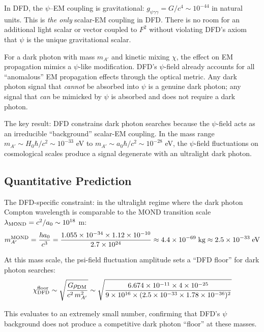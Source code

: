 \documentclass[11pt]{article}
\begin{document}
In DFD, the $\psi$--EM coupling is gravitational:
$g_{\psi\gamma\gamma} = G/c^4 \sim 10^{-44}$ in natural units.  This is
\emph{the only} scalar-EM coupling in DFD.  There is no room for an
additional light scalar or vector coupled to $F^2$ without violating
DFD's axiom that $\psi$ is the unique gravitational scalar.

For a dark photon with mass $m_{A'}$ and kinetic mixing $\chi$, the
effect on EM propagation mimics a $\psi$-like modification.  DFD's
$\psi$-field already accounts for all ``anomalous'' EM propagation
effects through the optical metric.  Any dark photon signal that
\emph{cannot} be absorbed into $\psi$ is a genuine dark photon; any
signal that \emph{can} be mimicked by $\psi$ is absorbed and does
not require a dark photon.

The key result: DFD constrains dark photon searches because the
$\psi$-field acts as an irreducible ``background'' scalar-EM coupling.
In the mass range $m_{A'} \sim H_0\hbar/c^2 \sim 10^{-33}$ eV to
$m_{A'} \sim a_0\hbar/c^2 \sim 10^{-28}$ eV, the $\psi$-field
fluctuations on cosmological scales produce a signal degenerate with
an ultralight dark photon.

\subsection{Quantitative Prediction}

The DFD-specific constraint: in the ultralight regime where the dark
photon Compton wavelength is comparable to the MOND transition scale
$\lambda_{\rm MOND} = c^2/a_0 \sim 10^{18}$ m:
\begin{equation}
m_{A'}^{\rm MOND} = \frac{\hbar a_0}{c^3}
= \frac{1.055 \times 10^{-34} \times 1.12 \times 10^{-10}}{2.7 \times 10^{24}}
\approx 4.4 \times 10^{-69}\;\text{kg}
\approx 2.5 \times 10^{-33}\;\text{eV}
\end{equation}

At this mass scale, the psi-field fluctuation amplitude sets a
``DFD floor'' for dark photon searches:
\begin{equation}
\chi_{\rm DFD}^{\rm floor} \sim \sqrt{\frac{G\rho_{\rm DM}}{c^2\,m_{A'}^2}}
\sim \sqrt{\frac{6.674 \times 10^{-11} \times 4 \times 10^{-25}}
{9 \times 10^{16} \times (2.5 \times 10^{-33} \times 1.78 \times 10^{-36})^2}}
\end{equation}

This evaluates to an extremely small number, confirming that DFD's
$\psi$ background does not produce a competitive dark photon ``floor''
at these masses.
\end{document}
